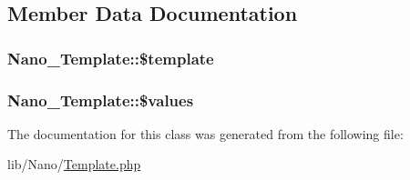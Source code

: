 \subsection{Member Data Documentation}
\hypertarget{classNano__Template_4ba7e9617808030dd65b5c2b5aba24a7}{
\subsubsection[{\$template}]{\setlength{\rightskip}{0pt plus 5cm}Nano\_\-Template::\$template}}
\label{classNano__Template_4ba7e9617808030dd65b5c2b5aba24a7}


\hypertarget{classNano__Template_8f485b6c95c2aa9b105654950ef1a45d}{
\subsubsection[{\$values}]{\setlength{\rightskip}{0pt plus 5cm}Nano\_\-Template::\$values}}
\label{classNano__Template_8f485b6c95c2aa9b105654950ef1a45d}




The documentation for this class was generated from the following file:\begin{CompactItemize}
\item 
lib/Nano/\hyperlink{Template_8php}{Template.php}\end{CompactItemize}
